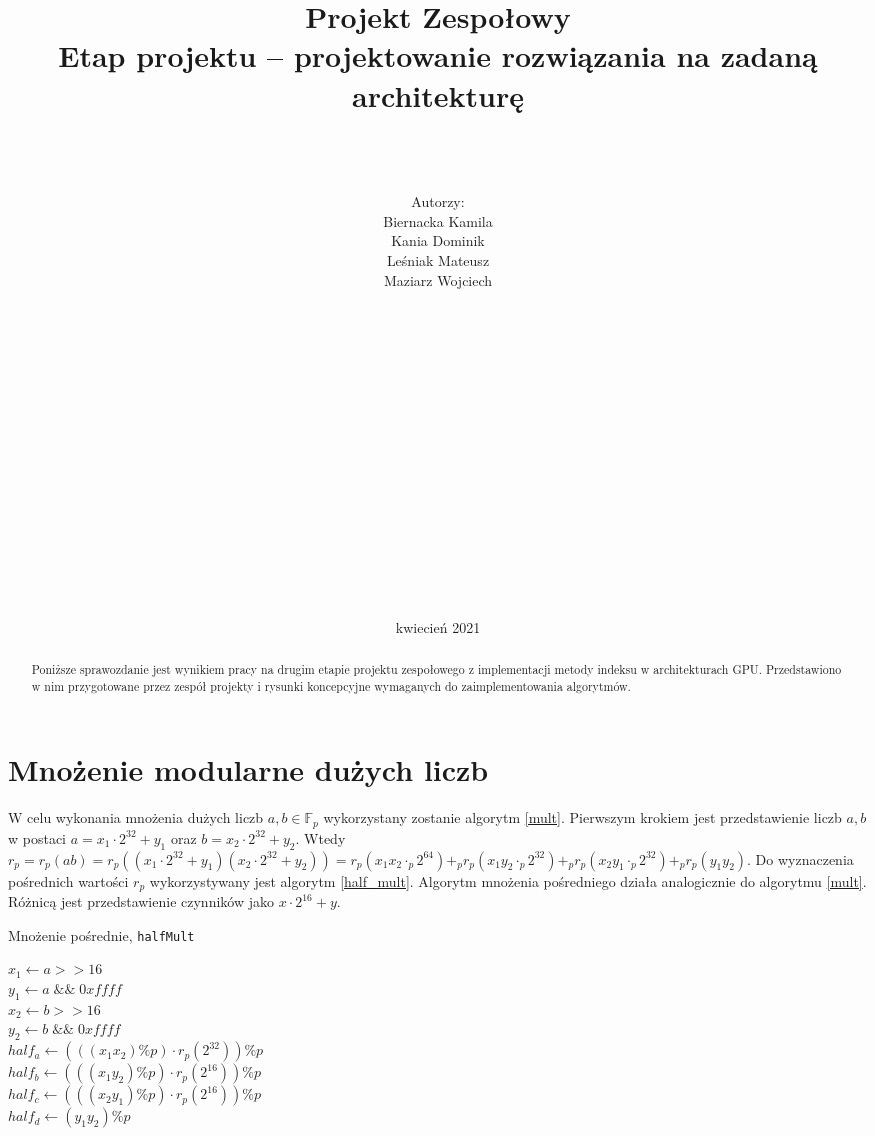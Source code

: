 \documentclass[]{article}
\title{Projekt Zespołowy \\
	\Huge Etap projektu – projektowanie rozwiązania na zadaną architekturę}
\author{\\ \\ \\ Autorzy:
	\\Biernacka Kamila\\ 
	Kania Dominik\\ 
	Leśniak Mateusz\\ 
	Maziarz Wojciech\\ \\ \\ \\ \\ \\ \\ \\ \\ \\ \\ \\ \\ \\ \\ \\ \\  }
\date{kwiecień 2021}
\begin{document}
\maketitle
\newpage



\begin{abstract}
Poniższe sprawozdanie jest wynikiem pracy na drugim etapie projektu zespołowego z implementacji metody indeksu w architekturach GPU. Przedstawiono w nim przygotowane przez zespół projekty i rysunki koncepcyjne wymaganych do zaimplementowania algorytmów.
\end{abstract}

\tableofcontents
\newpage

\section{Mnożenie modularne dużych liczb}
	W celu wykonania mnożenia dużych liczb \(a, b \in \mathbb{F}_p\) wykorzystany zostanie algorytm \ref{mult}.
	Pierwszym krokiem jest przedstawienie liczb \(a, b\) w postaci \(a = x_1 \cdot 2^{32} + y_1\) oraz 
	\(b = x_2 \cdot 2^{32} + y_2\).
	\newline
	Wtedy
	\newline
	\(r_p = r_p(ab) = r_p((x_1 \cdot 2^{32} + y_1)(x_2 \cdot 2^{32} + y_2)) = r_p(x_1x_2 \cdot_p 2^{64}) +_p r_p(x_1y_2 \cdot_p 2^{32}) +_p r_p(x_2y_1 \cdot_p 2^{32}) +_p r_p(y_1y_2)\).
	\newline 
	Do wyznaczenia pośrednich wartości \(r_p\) wykorzystywany jest algorytm \ref{half_mult}. Algorytm mnożenia pośredniego działa analogicznie do algorytmu \ref{mult}. Różnicą jest przedstawienie czynników jako \(x \cdot 2^{16} + y\).
	\newline
	\begin{algorithm}[H]
		\SetAlgoLined
		\caption{Mnożenie pośrednie, \texttt{halfMult}}
		\label{half_mult}
		\(x_1 \gets a >> 16\)\\
		\(y_1 \gets a \; \&\& \; 0xffff \) \\
		\(x_2 \gets b >> 16\)\\
		\(y_2 \gets b \; \&\& \; 0xffff \) \\
		\(half_a \gets (((x_1 x_2) \% p) \cdot r_p(2^{32})) \%p\) \\
		\(half_b \gets (((x_1 y_2) \% p) \cdot r_p(2^{16})) \%p\) \\
		\(half_c \gets (((x_2 y_1) \% p) \cdot r_p(2^{16})) \%p\) \\
		\(half_d \gets (y_1 y_2) \%p\) \\
	\end{algorithm}
	
\end{document}
